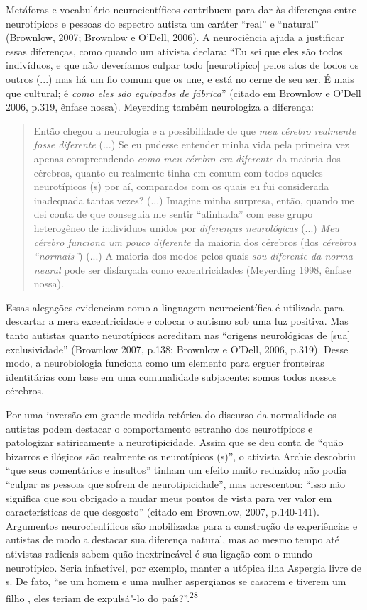 Metáforas e vocabulário neurocientíficos contribuem para dar às
diferenças entre neurotípicos e pessoas do espectro autista um caráter
``real'' e ``natural'' (Brownlow, 2007; Brownlow e O'Dell, 2006). A
neurociência ajuda a justificar essas diferenças, como quando um
ativista declara: ``Eu sei que eles são todos indivíduos, e que não
deveríamos culpar todo  {[}neurotípico{]} pelos atos de todos os
outros  (...) mas há um fio comum que os une, e está no cerne de seu
ser. É mais que cultural; é \emph{como eles são equipados de fábrica}''
(citado em Brownlow e O'Dell 2006, p.319, ênfase nossa). Meyerding
também neurologiza a diferença:

\begin{quote}
Então chegou a neurologia e a possibilidade de que \emph{meu cérebro
realmente fosse diferente} (...) Se eu pudesse entender minha vida pela
primeira vez apenas compreendendo \emph{como meu cérebro era diferente}
da maioria dos cérebros, quanto eu realmente tinha em comum com todos
aqueles neurotípicos (s) por aí, comparados com os quais eu fui
considerada inadequada tantas vezes? (...) Imagine minha surpresa,
então, quando me dei conta de que conseguia me sentir ``alinhada'' com
esse grupo heterogêneo de indivíduos unidos por \emph{diferenças
neurológicas} (...) \emph{Meu cérebro funciona um pouco diferente} da
maioria dos cérebros (dos \emph{cérebros ``normais''}) (...) A maioria
dos modos pelos quais \emph{sou diferente da norma neural} pode ser
disfarçada como excentricidades (Meyerding 1998, ênfase nossa).
\end{quote}

Essas alegações evidenciam como a linguagem neurocientífica é utilizada
para descartar a mera excentricidade e colocar o autismo sob uma luz
positiva. Mas tanto autistas quanto neurotípicos acreditam nas ``origens
neurológicas de {[}sua{]} exclusividade'' (Brownlow 2007, p.138;
Brownlow e O'Dell, 2006, p.319). Desse modo, a neurobiologia funciona
como um elemento para erguer fronteiras identitárias com base em uma
comunalidade subjacente: somos todos nossos cérebros.

Por uma inversão em grande medida retórica do discurso da normalidade os
autistas podem destacar o comportamento estranho dos neurotípicos e
patologizar satiricamente a neurotipicidade. Assim que se deu conta de
``quão bizarros e ilógicos são realmente os neurotípicos (s)'', o
ativista Archie descobriu ``que seus comentários e insultos'' tinham um
efeito muito reduzido; não podia ``culpar as pessoas que sofrem de
neurotipicidade'', mas acrescentou: ``isso não significa que sou
obrigado a mudar meus pontos de vista para ver valor em características
de que desgosto'' (citado em Brownlow, 2007, p.140-141). Argumentos
neurocientíficos são mobilizadas para a construção de experiências  e
autistas de modo a destacar sua diferença natural, mas ao mesmo tempo
até ativistas radicais sabem quão inextrincável é sua ligação com o
mundo neurotípico. Seria infactível, por exemplo, manter a utópica ilha
Aspergia livre de s. De fato, ``se um homem e uma mulher aspergianos
se casarem e tiverem um filho , eles teriam de expulsá"-lo do
país?''.\textsuperscript{28}

